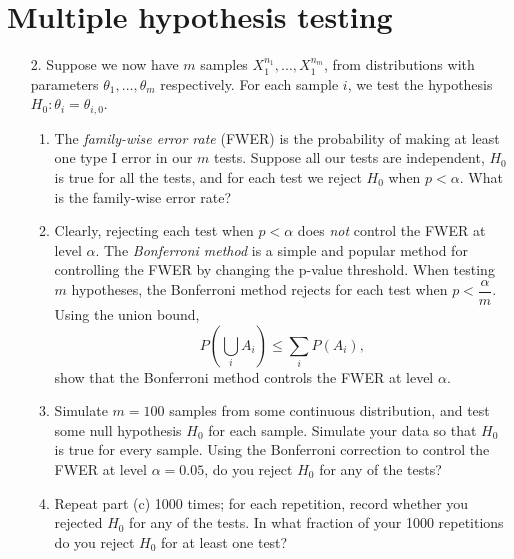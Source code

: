 \documentclass[11pt]{article}
\begin{document}
\section*{Multiple hypothesis testing}

\begin{enumerate}
\item[2.] Suppose we now have $m$ samples $X_1^{n_1}, ..., X_1^{n_m}$, from distributions with parameters $\theta_1,...,\theta_m$ respectively. For each sample $i$, we test the hypothesis $H_0: \theta_i = \theta_{i,0}$. 

\begin{enumerate}
\item The \textit{family-wise error rate} (FWER) is the probability of making at least one type I error in our $m$ tests. Suppose all our tests are independent, $H_0$ is true for all the tests, and for each test we reject $H_0$ when $p < \alpha$. What is the family-wise error rate?

\item Clearly, rejecting each test when $p < \alpha$ does \textit{not} control the FWER at level $\alpha$. The \textit{Bonferroni method} is a simple and popular method for controlling the FWER by changing the p-value threshold. When testing $m$ hypotheses, the Bonferroni method rejects for each test when $p < \dfrac{\alpha}{m}$.\\

Using the union bound,
$$P \left( \bigcup_i A_i \right) \leq \sum \limits_i P(A_i),$$
show that the Bonferroni method controls the FWER at level $\alpha$.

\item Simulate $m = 100$ samples from some continuous distribution, and test some null hypothesis $H_0$ for each sample. Simulate your data so that $H_0$ is true for every sample. Using the Bonferroni correction to control the FWER at level $\alpha = 0.05$, do you reject $H_0$ for any of the tests?

\item Repeat part (c) 1000 times; for each repetition, record whether you rejected $H_0$ for any of the tests. In what fraction of your 1000 repetitions do you reject $H_0$ for at least one test?
\end{enumerate}
\end{enumerate}
\end{document}
